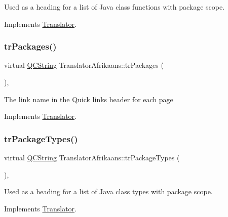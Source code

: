 Used as a heading for a list of Java class functions with package scope. 

Implements \mbox{\hyperlink{class_translator}{Translator}}.

\mbox{\label{class_translator_afrikaans_ab5b7817ae820f9e11eff0c3ce8f7d5e4}} 
\subsubsection{\texorpdfstring{trPackages()}{trPackages()}}
{\footnotesize\ttfamily virtual \mbox{\hyperlink{class_q_c_string}{Q\+C\+String}} Translator\+Afrikaans\+::tr\+Packages (\begin{DoxyParamCaption}{ }\end{DoxyParamCaption})\hspace{0.3cm}{\ttfamily [inline]}, {\ttfamily [virtual]}}

The link name in the Quick links header for each page 

Implements \mbox{\hyperlink{class_translator}{Translator}}.

\mbox{\label{class_translator_afrikaans_ae719ba94d324482889e78ae3d6940157}} 
\subsubsection{\texorpdfstring{trPackageTypes()}{trPackageTypes()}}
{\footnotesize\ttfamily virtual \mbox{\hyperlink{class_q_c_string}{Q\+C\+String}} Translator\+Afrikaans\+::tr\+Package\+Types (\begin{DoxyParamCaption}{ }\end{DoxyParamCaption})\hspace{0.3cm}{\ttfamily [inline]}, {\ttfamily [virtual]}}

Used as a heading for a list of Java class types with package scope. 

Implements \mbox{\hyperlink{class_translator}{Translator}}.

\mbox{\label{class_translator_afrikaans_a517d92b0a0c28ea75480d47f4ba5158e}} 
